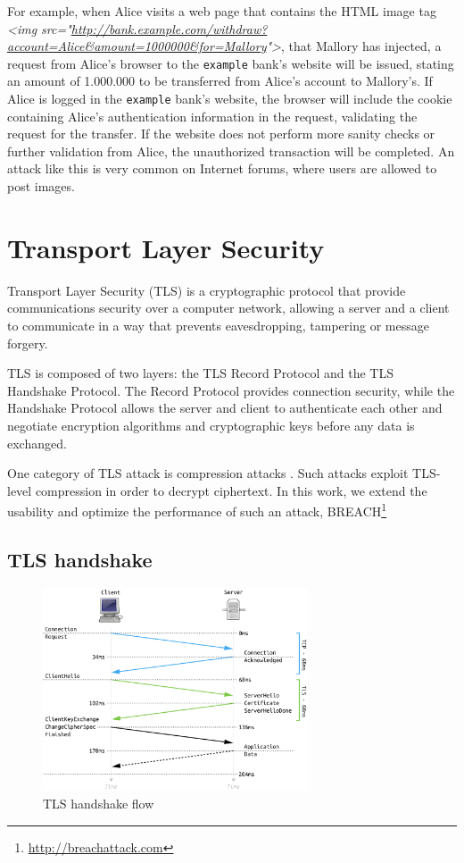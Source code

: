 For example, when Alice visits a web page that contains the HTML image tag
\textit{<img src="\url{http://bank.example.com/withdraw?account=Alice&amount=1000000&for=Mallory}">},
that Mallory has injected, a request from Alice's browser to the
\texttt{example} bank's website will be issued, stating an amount of
1.000.000 to be transferred from Alice's account to Mallory's. If Alice is
logged in the \texttt{example} bank's website, the browser will include the
cookie containing Alice's authentication information in the request, validating
the request for the transfer. If the website does not perform more sanity checks
or further validation from Alice, the unauthorized transaction will be
completed. An attack like this is very common on Internet forums, where users
are allowed to post images.

\section{Transport Layer Security}\label{sec:tls}

Transport Layer Security (TLS) is a cryptographic protocol that provide communications
security over a computer network, allowing a server and a client to communicate in a way
that prevents eavesdropping, tampering or message forgery.

TLS is composed of two layers:
the TLS Record Protocol and the TLS Handshake Protocol. The Record Protocol 
provides connection security, while the Handshake Protocol allows the server 
and client to authenticate each other and negotiate encryption algorithms 
and cryptographic keys before any data is exchanged.

One category of TLS attack is compression attacks \cite{compression_attacks}. 
Such attacks exploit TLS-level compression in order to decrypt ciphertext. 
In this work, we extend the usability and optimize the performance of such an attack, 
BREACH\footnote{\url{http://breachattack.com}}


\subsection{TLS handshake}

\begin{figure}[H] \caption{TLS handshake flow} \centering
\includegraphics[width=0.7\textwidth]{diagrams/tls_handshake.png}\end{figure}

